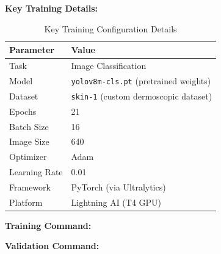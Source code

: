 \documentclass[a4paper,12pt]{report}
\begin{document}
\begin{spacing}{1.5}
    \textbf{Key Training Details:}
    \begin{table}[H]
    \centering
    \caption{Key Training Configuration Details}
    \begin{tabular}{|l|l|}
    \hline
    \textbf{Parameter} & \textbf{Value} \\
    \hline
    Task & Image Classification \\
    Model & \texttt{yolov8m-cls.pt} (pretrained weights) \\
    Dataset & \texttt{skin-1} (custom dermoscopic dataset) \\
    Epochs & 21 \\
    Batch Size & 16 \\
    Image Size & 640 \\
    Optimizer & Adam \\
    Learning Rate & 0.01 \\
    Framework & PyTorch (via Ultralytics) \\
    Platform & Lightning AI (T4 GPU) \\
    \hline
    \end{tabular}
    \end{table}
    
    \textbf{Training Command:}

    




    \textbf{Validation Command:}
    


\end{spacing}
\end{document}
